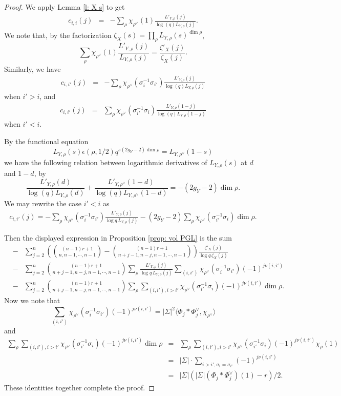 \documentclass[reqno]{amsart}
\numberwithin{equation}{subsection}
\theoremstyle{definition}
\newcommand{\s}{\sigma}
\newcommand{\z}{\zeta}
\newcommand{\ep}{\epsilon}
\begin{document}
\begin{proof}
We apply Lemma \ref{l: X s} to get
\begin{eqnarray*}
    c_{i,i}(j) &=&-\sum_{\rho} \chi_{\rho^\vee}(1)\frac{L'_{Y,\rho}(j)}{\log(q)L_{Y,\rho}(j)}.
    \end{eqnarray*}
We note that, by the factorization $\z_X(s)=\prod_\rho L_{Y,\rho}(s)^{\dim\rho}$,
$$\sum_{\rho} \chi_{\rho^\vee}(1)\frac{L'_{Y,\rho}(j)}{L_{Y,\rho}(j)}=\frac{\z'_X(j)}{\z_X(j)}.
$$
Similarly, we have
\begin{eqnarray*}
      c_{i,i'}(j) &=&-\sum_{\rho} \chi_{\rho^\vee}(\s_i^{-1}\s_{i'})\frac{L'_{Y,\rho}(j)}{\log(q)L_{Y,\rho}(j)}  
\end{eqnarray*}
when $i'>i$, and
\begin{eqnarray*}c_{i,i'}(j) &=&\sum_{\rho} \chi_{\rho^\vee}(\s_{i'}^{-1}\s_{i})\frac{L'_{Y,\rho}(1-j)}{\log(q)L_{Y,\rho}(1-j)} 
\end{eqnarray*}
when $i'<i$.

By the functional equation
$$L_{Y,\rho}(s)\ep(\rho,1/2) q^{s(2g_Y-2)\dim\rho}=L_{Y,\rho^\vee}(1-s)
$$
we have the following relation between logarithmic derivatives of $L_{Y,\rho}(s)$ at $d$ and $1-d$,
by 
$$
\frac{L'_{Y,\rho}(d)}{\log(q)L_{Y,\rho}(d)}+\frac{L'_{Y,\rho^\vee}(1-d)}{\log(q)L_{Y,\rho^\vee}(1-d)}=-(2g_Y-2)\dim\rho.
$$
We may rewrite the case  $i'<i$ as
\begin{eqnarray*}
c_{i,i'}(j)  =-\sum_{\rho} \chi_{\rho^\vee}(\s_{i}^{-1}\s_{i'})\frac{L'_{Y,\rho}(j)}{\log q\,L_{Y,\rho}(j)}-(2g_Y-2)\sum_{\rho} \chi_{\rho^\vee}(\s_{i'}^{-1}\s_{i}) \dim\rho.
\end{eqnarray*}


Then the displayed expression in Proposition \ref{prop: vol PGL} is the sum 
\begin{eqnarray*}
&-&\sum_{j=2}^n\left(\binom{(n-1)r+1}{n,n-1,\cdots, n-1}-\binom{(n-1)r+1}{n+j-1,n-j,n-1,\cdots, n-1}\right) \frac{\z'_X(j)}{\log q\,\z_X(j)}\\
   &-&\sum_{j=2}^n  \binom{(n-1)r+1}{n+j-1,n-j,n-1,\cdots, n-1}\sum_{\rho}\frac{L'_{Y,\rho}(j)}{\log q \,L_{Y,\rho}(j)} \sum_{(i,i')} \chi_{\rho^\vee}(\s_i^{-1}\s_{i'}) (-1)^{j\nu(i,i')}  \\
   &-&
      \sum_{j=2}^n  \binom{(n-1)r+1}{n+j-1,n-j,n-1,\cdots, n-1} \sum_{\rho} \sum_{(i, i'), i> i'}\chi_{\rho^\vee}(\s_{i'}^{-1}\s_{i})  (-1)^{j\nu(i,i')}  \dim\rho.
\end{eqnarray*}
Now we note that
$$
\sum_{(i,i')} \chi_{\rho^\vee}(\s_i^{-1}\s_{i'}) (-1)^{j\nu(i,i')}=|\Sigma|^2\langle{\Phi_j\ast\Phi_j^\vee, \chi_{\rho^\vee} \rangle}
$$
and
\begin{eqnarray*}
\sum_{\rho} \sum_{(i, i'), i> i'}\chi_{\rho^\vee}(\s_{i'}^{-1}\s_{i}) (-1)^{j\nu(i,i')}  \dim\rho
&=&\sum_{\rho} \sum_{(i, i'), i> i'}\chi_{\rho^\vee}(\s_{i'}^{-1}\s_{i}) (-1)^{j\nu(i,i')}  \chi_{\rho}(1)\\
&=&|\Sigma|\cdot\sum_{ i> i', \s_i=\s_{i'}} (-1)^{j\nu(i,i')} \\
&=&|\Sigma|(|\Sigma|(\Phi_j\ast\Phi_j^\vee)(1)-r)/2.
\end{eqnarray*}
These identities together complete the proof.


\end{proof}














\appendix
\end{document}
